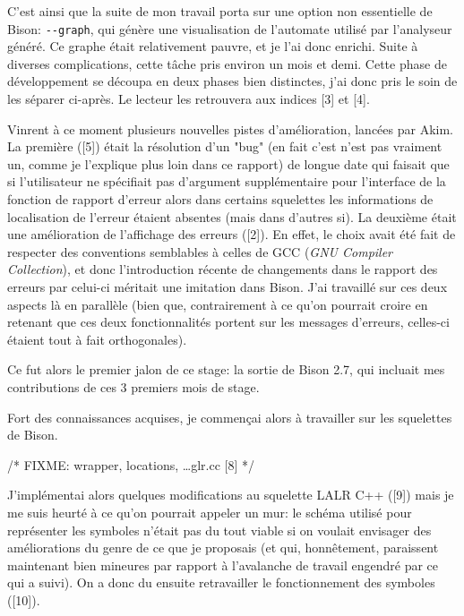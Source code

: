 \documentclass[a4paper,11pt,twoside,final]{article}
\begin{document}
  C'est ainsi que la suite de mon travail porta sur une option non essentielle
  de Bison: \texttt{-{}-graph}, qui génère une visualisation de l'automate utilisé
  par l'analyseur généré. Ce graphe était relativement pauvre, et je l'ai donc
  enrichi. Suite à diverses complications, cette tâche pris environ un mois et
  demi. Cette phase de développement se découpa en deux phases bien distinctes,
  j'ai donc pris le soin de les séparer ci-après. Le lecteur les retrouvera aux
  indices [3] et [4].

  Vinrent à ce moment plusieurs nouvelles pistes d'amélioration, lancées par
  Akim. La première ([5]) était la résolution d'un "bug" (en fait c'est n'est
  pas vraiment un, comme je l'explique plus loin dans ce rapport) de longue
  date qui faisait que si l'utilisateur ne spécifiait pas d'argument
  supplémentaire pour l'interface de la fonction de rapport d'erreur alors dans
  certains squelettes les informations de localisation de l'erreur étaient
  absentes (mais dans d'autres si). La deuxième était une amélioration de
  l'affichage des erreurs ([2]). En effet, le choix avait été fait de respecter
  des conventions semblables à celles de GCC (\textit{GNU Compiler
  Collection}), et donc l'introduction récente de changements dans le rapport
  des erreurs par celui-ci méritait une imitation dans Bison. J'ai travaillé
  sur ces deux aspects là en parallèle (bien que, contrairement à ce qu'on
  pourrait croire en retenant que ces deux fonctionnalités portent sur les
  messages d'erreurs, celles-ci étaient tout à fait orthogonales).

  Ce fut alors le premier jalon de ce stage: la sortie de Bison 2.7, qui
  incluait mes contributions de ces 3 premiers mois de stage.

  Fort des connaissances acquises, je commençai alors à travailler sur les
  squelettes de Bison.

  /* FIXME: wrapper, locations, \ldots glr.cc [8] */

  J'implémentai alors quelques modifications au squelette LALR C++ ([9]) mais
  je me suis heurté à ce qu'on pourrait appeler un mur: le schéma utilisé pour
  représenter les symboles n'était pas du tout viable si on voulait envisager
  des améliorations du genre de ce que je proposais (et qui, honnêtement,
  paraissent maintenant bien mineures par rapport à l'avalanche de travail
  engendré par ce qui a suivi). On a donc du ensuite retravailler le
  fonctionnement des symboles ([10]).
\end{document}
